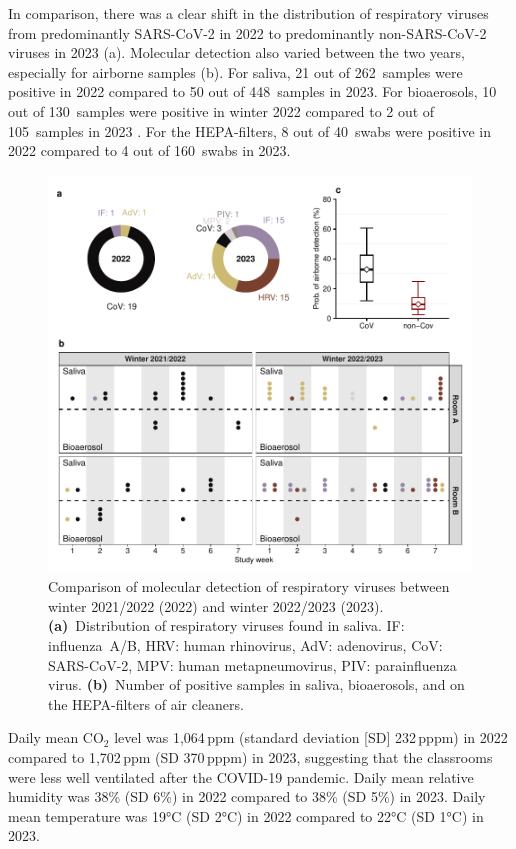 \documentclass[fleqn,11pt]{wlscirep}
\begin{document}
In comparison, there was a clear shift in the distribution of respiratory viruses from predominantly SARS-CoV-2 in 2022 to predominantly non-SARS-CoV-2 viruses in 2023 (a). Molecular detection also varied between the two years, especially for airborne samples (b). For saliva, 21 out of 262~samples were positive in 2022 compared to 50 out of 448~samples in 2023. For bioaerosols, 10 out of 130~samples were positive in winter 2022 compared to 2 out of 105~samples in 2023 . For the HEPA-filters, 8 out of 40~swabs were positive in 2022 compared to 4 out of 160~swabs in 2023. 

\begin{figure}
    \centering
    \includegraphics{results/comparison.pdf}
    \caption{Comparison of molecular detection of respiratory viruses between winter 2021/2022 (2022) and winter 2022/2023 (2023). \textbf{(a)}~Distribution of respiratory viruses found in saliva. IF: influenza~A/B, HRV: human rhinovirus, AdV: adenovirus, CoV: SARS-CoV-2, MPV: human metapneumovirus, PIV: parainfluenza virus. \textbf{(b)}~Number of positive samples in saliva, bioaerosols, and on the HEPA-filters of air cleaners.}
    \label{fig:comparison}
\end{figure}


Daily mean CO$_2$ level was 1,064\,ppm (standard deviation [SD] 232\,pppm) in 2022 compared to 1,702\,ppm (SD 370\,pppm) in 2023, suggesting that the classrooms were less well ventilated after the COVID-19 pandemic. Daily mean relative humidity was 38\% (SD 6\%) in 2022 compared to 38\% (SD 5\%) in 2023. Daily mean temperature was 19°C (SD 2°C) in 2022 compared to 22°C (SD 1°C) in 2023. 
\end{document}
